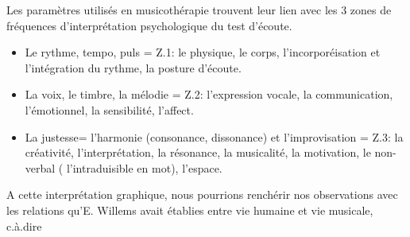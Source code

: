 Les paramètres utilisés en musicothérapie trouvent leur lien avec les
3 zones de fréquences d'interprétation psychologique du test d'écoute.
\begin{itemize}
 \item Le rythme, tempo, puls  =  Z.1: le physique, le corps, l'incorporéisation et
l'intégration du rythme,
la posture d'écoute.

\item La voix, le timbre, la mélodie =  Z.2:  l'expression vocale, la communication,
l'émotionnel, la sensibilité, l'affect.

\item La justesse= l'harmonie (consonance, dissonance) et l'improvisation = Z.3:  la créativité, l'interprétation, la
résonance, la musicalité, la motivation, le non-verbal (
l'intraduisible en mot), l'espace.
\end{itemize}
A cette interprétation graphique, nous pourrions renchérir nos
observations avec les relations
qu'E.
Willems  avait établies entre vie humaine et vie musicale, c.à.dire
